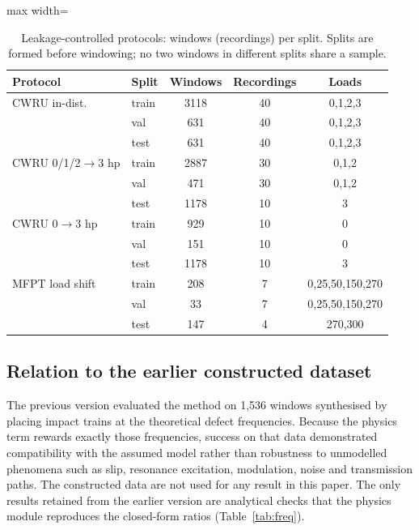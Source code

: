 \documentclass[conference]{IEEEtran}
\begin{document}
\begin{table}[t]
\caption{Leakage-controlled protocols: windows (recordings) per split. Splits are formed before windowing; no two windows in different splits share a sample.}
\label{tab:protocols}
\centering
\footnotesize
\begin{adjustbox}{max width=\columnwidth}
\begin{tabular}{llccc}
\toprule
Protocol & Split & Windows & Recordings & Loads \\
\midrule
CWRU in-dist. & train & 3118 & 40 & 0,1,2,3 \\
 & val & 631 & 40 & 0,1,2,3 \\
 & test & 631 & 40 & 0,1,2,3 \\
\midrule
CWRU 0/1/2$\to$3 hp & train & 2887 & 30 & 0,1,2 \\
 & val & 471 & 30 & 0,1,2 \\
 & test & 1178 & 10 & 3 \\
\midrule
CWRU 0$\to$3 hp & train & 929 & 10 & 0 \\
 & val & 151 & 10 & 0 \\
 & test & 1178 & 10 & 3 \\
\midrule
MFPT load shift & train & 208 & 7 & 0,25,50,150,270 \\
 & val & 33 & 7 & 0,25,50,150,270 \\
 & test & 147 & 4 & 270,300 \\
\bottomrule
\end{tabular}
\end{adjustbox}
\end{table}


\subsection{Relation to the earlier constructed dataset}
The previous version evaluated the method on 1{,}536 windows synthesised by
placing impact trains at the theoretical defect frequencies. Because the
physics term rewards exactly those frequencies, success on that data
demonstrated compatibility with the assumed model rather than robustness to
unmodelled phenomena such as slip, resonance excitation, modulation, noise and
transmission paths. The constructed data are not used for any result in this
paper. The only results retained from the earlier version are analytical checks
that the physics module reproduces the closed-form ratios (Table~\ref{tab:freq}).
\end{document}
